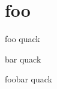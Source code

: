 \documentclass{beamer}
\begin{document}
\section{foo}
\begin{frame}{foo}
  quack
\end{frame}

\begin{frame}{bar}
  quack
\end{frame}

\begin{frame}{foobar}
  quack
\end{frame}
\end{document}
